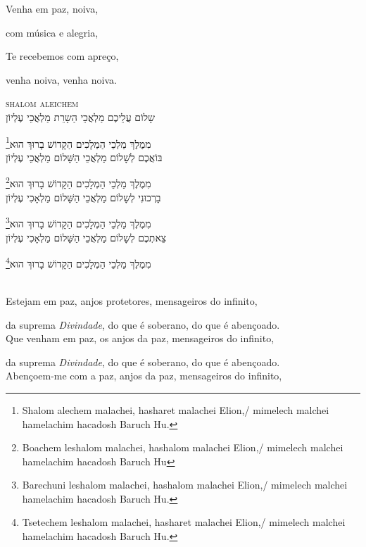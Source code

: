 Venha em paz, noiva,

com música e alegria,

Te recebemos com apreço,

venha noiva, venha noiva.

\movetoevenpage
\raggedleft

\textsc{shalom aleichem}\\[15pt]

שָלוֹם עֲלֵיכֶם מַלְאֲכֵי הַשָרֵת מַלְאֲכֵי עֶלְיוֹן

מִמֶלֶךְ מַלְכֵי הַמְלָכִים הַקָדוֹשׁ בָרוּךְ הוּא\footnote{Shalom alechem malachei, hasharet malachei Elion,/
mimelech malchei hamelachim hacadosh Baruch Hu.}\\[10pt]

בּוֹאֲכֶם לְשָׁלוֹם מַלְאֲכֵי הַשָּׁלוֹם מַלְאֲכֵי עֶלְיוֹן

מִמֶלֶךְ מַלְכֵי הַמְלָכִים הַקָדוֹשׁ בָרוּךְ הוּא\footnote{Boachem leshalom malachei, hashalom malachei Elion,/
mimelech malchei hamelachim hacadosh Baruch Hu}\\[10pt]

בָרְכוּנִי לְשָלוֹם מַלְאֲכֵי הַשָּׁלוֹם מַלְאָכִי עֶלְיוֹן

מִמֶלֶךְ מַלְכֵי הַמְלָכִים הַקָדוֹשׁ בָרוּךְ הוּא\footnote{Barechuni leshalom malachei, hashalom malachei Elion,/
mimelech malchei hamelachim hacadosh Baruch Hu.}\\[10pt]

צֵאתְכֶם לְשָלוֹם מַלְאֲכֵי הַשָּׁלוֹם מַלְאָכִי עֶלְיוֹן

מִמֶלֶךְ מַלְכֵי הַמְלָכִים הַקָדוֹשׁ בָרוּךְ הוּא\footnote{Tsetechem leshalom malachei, hasharet malachei Elion,/
mimelech malchei hamelachim hacadosh Baruch Hu.}

\movetooddpage
\raggedright

\textsc{}\\[15pt]

Estejam em paz, anjos protetores,\qb{} mensageiros do infinito,

da suprema \emph{Divindade},  \qb{}do que é soberano, do que é abençoado.\\[10pt]

Que venham em paz, os anjos da paz,\qb{} mensageiros do infinito,

da suprema \emph{Divindade},\qb{} do que é soberano, do que é abençoado.\\[10pt]

Abençoem-me com a paz,\qb{} anjos da paz, mensageiros do infinito,

